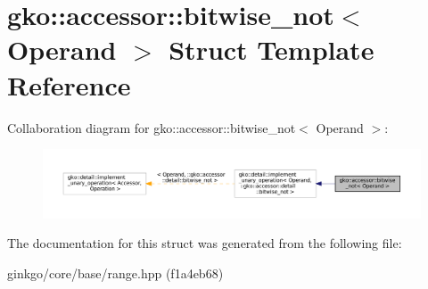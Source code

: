 \hypertarget{structgko_1_1accessor_1_1bitwise__not}{}\section{gko\+:\+:accessor\+:\+:bitwise\+\_\+not$<$ Operand $>$ Struct Template Reference}
\label{structgko_1_1accessor_1_1bitwise__not}


Collaboration diagram for gko\+:\+:accessor\+:\+:bitwise\+\_\+not$<$ Operand $>$\+:
\nopagebreak
\begin{figure}[H]
\begin{center}
\leavevmode
\includegraphics[width=350pt]{structgko_1_1accessor_1_1bitwise__not__coll__graph}
\end{center}
\end{figure}


The documentation for this struct was generated from the following file\+:\begin{DoxyCompactItemize}
\item 
ginkgo/core/base/range.\+hpp (f1a4eb68)\end{DoxyCompactItemize}
